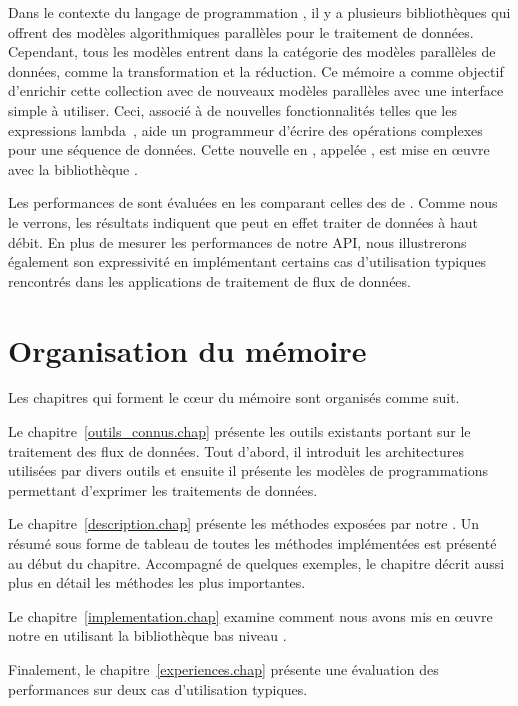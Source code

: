 \begin{introduction}
Dans le contexte du langage de programmation , il y a plusieurs biblioth\`eques qui offrent des mod\`eles algorithmiques parall\`eles pour le traitement de donn\'ees. Cependant, tous les mod\`eles entrent dans la cat\'egorie des mod\`eles parall\`eles de donn\'ees, comme la transformation et la r\'eduction. Ce m\'emoire a comme objectif d'enrichir cette collection avec de nouveaux mod\`eles parall\`eles avec une interface simple \`a utiliser. Ceci, associ\'e \`a de nouvelles fonctionnalit\'es telles que les expressions lambda~\citep{josuttis2012c++}, aide un programmeur d'\'ecrire des op\'erations complexes pour une s\'equence de donn\'ees. Cette nouvelle  en , appel\'ee ,  est mise en \oe{}uvre avec la biblioth\`eque .

Les performances de  sont \'evalu\'ees en les comparant celles des  de . Comme nous le verrons, les r\'esultats indiquent que  peut en effet traiter de donn\'ees \`a haut d\'ebit. En plus de mesurer les performances de notre API, nous illustrerons \'egalement son expressivit\'e en impl\'ementant certains cas d'utilisation typiques rencontr\'es dans les applications de traitement de flux de donn\'ees.


\section*{Organisation du m\'emoire}

Les chapitres qui forment le c\oe{}ur du m\'emoire sont organis\'es
comme suit.



Le chapitre~\ref{outils_connus.chap}  pr\'esente les outils existants portant sur le traitement des flux de donn\'ees.  Tout d'abord, il introduit les architectures utilis\'ees par divers outils et ensuite il pr\'esente les mod\`eles de programmations permettant d'exprimer les traitements de donn\'ees.

Le chapitre~\ref{description.chap}  pr\'esente les m\'ethodes expos\'ees par notre . Un r\'esum\'e sous forme de tableau de toutes les m\'ethodes implément\'ees est pr\'esent\'e au d\'ebut du chapitre. Accompagn\'e de quelques exemples, le chapitre d\'ecrit aussi plus en d\'etail les m\'ethodes les plus importantes.

Le chapitre~\ref{implementation.chap}  examine comment nous avons mis en œuvre notre  en utilisant la biblioth\`eque bas niveau .

Finalement, le chapitre~\ref{experiences.chap}  pr\'esente une \'evaluation des performances sur deux cas d'utilisation typiques.

\end{introduction}

